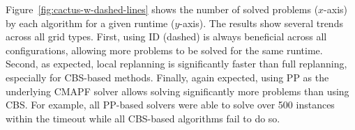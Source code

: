\documentclass[letterpaper]{article} %
\def\
UrlFont{\rm}  %
\theoremstyle{definition}
\begin{document}


Figure~\ref{fig:cactus-w-dashed-lines} shows the number of solved problems  ($x$-axis) by each algorithm for a given runtime ($y$-axis).
The results show several trends across all grid types.
First, using ID (dashed) is always beneficial across all configurations, allowing more problems to be solved for the same runtime. Second, as expected, local replanning is significantly faster than full replanning, especially for CBS-based methods.  Finally, again expected, using PP as the underlying CMAPF solver allows solving significantly more problems than using CBS. For example, all PP-based solvers were able to solve over 500 instances within the timeout while all CBS-based algorithms fail to do so.
\end{document}
